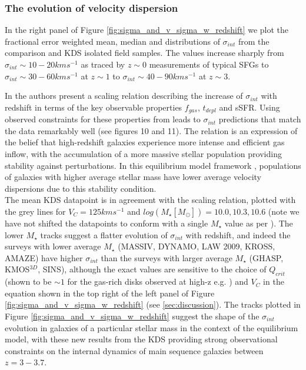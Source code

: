 \documentclass[fleqn,usenatbib]{mn2e}
\begin{document}
\subsubsection{The evolution of velocity dispersion}\label{subsubsec:sigma_evolution}

In the right panel of Figure \ref{fig:sigma_and_v_sigma_w_redshift} we plot the fractional error weighted mean, median and distributions of $\sigma_{int}$ from the comparison and KDS isolated field samples.
The values increase sharply from $\sigma_{int} \sim 10-20kms^{-1}$ as traced by $z\sim0$ measurements of typical SFGs to $\sigma_{int} \sim 30-60kms^{-1}$ at $z\sim1$ to $\sigma_{int} \sim 40-90kms^{-1}$ at $z\sim3$.

In \cite{Wisnioski2015} the authors present a scaling relation describing the increase of $\sigma_{int}$ with redshift in terms of the key observable properties $f_{gas}$, $t_{depl}$ and sSFR.
Using observed constraints for these properties from \cite{Tacconi2013} leads to $\sigma_{int}$ predictions that match the data remarkably well (see \cite{Wisnioski2015} figures 10 and 11).
The relation is an expression of the belief that high-redshift galaxies experience more intense and efficient gas inflow, with the accumulation of a more massive stellar population providing stability against perturbations.
In this equilibrium model framework \citep[e.g.][]{Dave2012,Lilly2013,Saintonge2013}, populations of galaxies with higher average stellar mass have lower average velocity dispersions due to this stability condition.  \\

The mean KDS datapoint is in agreement with the scaling relation, plotted with the grey lines for $V_{C} = 125kms^{-1}$ and $log(M_{\star}[M_{\odot}])=10.0,10.3,10.6$ (note we have not shifted the datapoints to conform with a single $M_{\star}$ value as per \cite{Wisnioski2015}).
The lower $M_{\star}$ tracks suggest a flatter evolution of $\sigma_{int}$ with redshift, and indeed the surveys with lower average $M_{\star}$ (MASSIV, DYNAMO, LAW 2009, KROSS, AMAZE) have higher $\sigma_{int}$ than the surveys with larger average $M_{\star}$ (GHASP, KMOS$^{3D}$, SINS), although the exact values are sensitive to the choice of $Q_{crit}$ (shown to be $\sim1$ for the gas-rich disks observed at high-z e.g. \citealt{ForsterSchreiber2006,Genzel2011,Newman2013}) and $V_{C}$ in the equation shown in the top right of the left panel of Figure \ref{fig:sigma_and_v_sigma_w_redshift} (see \cref{sec:discussion}).
The tracks plotted in Figure \ref{fig:sigma_and_v_sigma_w_redshift} suggest the shape of the $\sigma_{int}$ evolution in galaxies of a particular stellar mass in the context of the equilibrium model, with these new results from the KDS providing strong observational constraints on the internal dynamics of main sequence galaxies between $z=3-3.7$.
\end{document}

